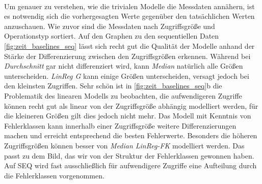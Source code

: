 \documentclass[
	12pt,
	a4paper,
	BCOR10mm,
	DIV14,
	listof=totoc,
	bibliography=totoc,
	headsepline
]{scrreprt}
\begin{document}
\begin{table}
	\scriptsize
	 \\
	\caption{Ergebnisse der trivialen Modelle}
	\label{tab:triv}
\end{table}
Um genauer zu verstehen, wie die trivialen Modelle die Messdaten annähern, ist es notwendig sich die vorhergesagten Werte gegenüber den tatsächlichen Werten anzuschauen.
Wie zuvor sind die Messdaten nach Zugriffsgröße und Operationstyp sortiert. 
Auf den Graphen zu den sequentiellen Daten \ref{fig:zeit_baselines_seq} lässt sich recht gut die Qualität der Modelle anhand der Stärke der Differenzierung zwischen den Zugriffsgrößen erkennen.
Während bei \textit{Durchschnitt} gar nicht differenziert wird, kann \textit{Median} natürlich alle Größen unterscheiden. 
\textit{LinReg G} kann einige Größen unterscheiden, versagt jedoch bei den kleinsten Zugriffen.
Sehr schön ist in  \ref{fig:zeit_baselines_seq}b die Problematik des linearen Modells zu beobachten, die aufwendigeren Zugriffe können recht gut als linear von der Zugriffsgröße abhängig modelliert werden, für die kleineren Größen gilt dies jedoch nicht mehr.
Das Modell mit Kenntnis von Fehlerklassen kann innerhalb einer Zugriffsgröße weitere Differenzierungen machen und erreicht entsprechend die besten Fehlerwerte.
Besonders die höheren Zugriffsgrößen können besser von \textit{Median LinReg-FK} modelliert werden. Das passt zu dem Bild, das wir von der Struktur der Fehlerklassen gewonnen haben. Auf SEQ wird fast ausschließlich für aufwendigere Zugriffe eine Aufteilung durch die Fehlerklassen vorgenommen. 
\end{document}
